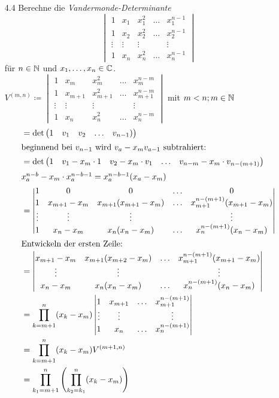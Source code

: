 \documentclass{HM}
\begin{document}
\begin{enumerate}
	\item[4.4] Berechne die \textit{Vandermonde-Determinante}\\
		$$\begin{vmatrix}
			1&x_1&x_1^2&\hdots&x_1^{n-1}\\
			1&x_2&x_2^2&\hdots&x_2^{n-1}\\
			\vdots&\vdots&\vdots&&\vdots\\
			1&x_n&x_n^2&\hdots&x_n^{n-1}
		\end{vmatrix}$$
		für $n\in\mathbb{N}$ und $x_1,\hdots,x_n\in\mathbb{C}$.\\
		$V^{(m,n)}\coloneqq\begin{vmatrix}
			1&x_m&x_m^2&\hdots&x_m^{n-m}\\
			1&x_{m+1}&x_{m+1}^2&\hdots&x_{m+1}^{n-m}\\
			\vdots&\vdots&\vdots&&\vdots\\
			1&x_n&x_n^2&\hdots&x_n^{n-m}
		\end{vmatrix}$ mit $m<n; m\in\mathbb{N}$
		\begin{align*}
			&=\det\begin{pmatrix}1&v_1&v_2&\hdots&v_{n-1})\end{pmatrix}\\
			\intertext{beginnend bei $v_{n-1}$ wird $v_a-x_mv_{a-1}$ subtrahiert:}
			&=\det\begin{pmatrix}1&v_1-x_m\cdot 1&v_2-x_m\cdot v_1&\hdots&v_{n-m}-x_m\cdot v_{n-(m+1)}\end{pmatrix}\\
			\intertext{$x_a^{n-b}-x_m\cdot x_a^{n-b-1} = x_a^{n-b-1}(x_a-x_m)$}
			&=\begin{vmatrix}
				1&0&0&\hdots&0\\
				1&x_{m+1}-x_m&x_{m+1}(x_{m+1}-x_m)&\hdots&x_{m+1}^{n-(m+1)}(x_{m+1}-x_m)\\
				\vdots&\vdots&\vdots&&\vdots\\
				1&x_n-x_m&x_n(x_n-x_m)&\hdots&x_n^{n-(m+1)}(x_n-x_m)
			\end{vmatrix}\\
			\intertext{Entwickeln der ersten Zeile:}
			&=\begin{vmatrix}
				x_{m+1}-x_m&x_{m+1}(x_{m+2}-x_m)&\hdots&x_{m+1}^{n-(m+1)}(x_{m+1}-x_m)\\
				\vdots&\vdots&&\vdots\\
				x_n-x_m&x_n(x_n-x_m)&\hdots&x_n^{n-(m+1)}(x_n-x_m)
			\end{vmatrix}\\
			&=\prod\limits_{k=m+1}^n(x_k-x_m)\begin{vmatrix}
				1&x_{m+1}&\hdots&x_{m+1}^{n-(m+1)}\\
				\vdots&\vdots&&\vdots\\
				1&x_n&\hdots&x_n^{n-(m+1)}
			\end{vmatrix}\\
			&=\prod\limits_{k=m+1}^n(x_k-x_m)V^{(m+1, n)}\\
			&=\prod\limits_{k_1=m+1}^n\left(\prod\limits_{k_2=k_1}^n(x_k-x_m)\right)
		\end{align*}
		

\end{enumerate}
\end{document}
